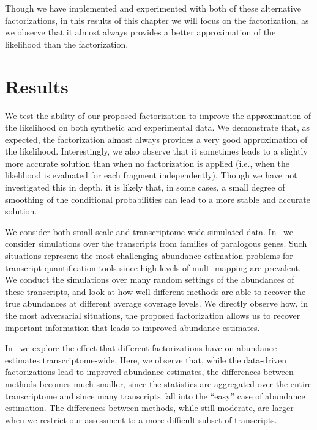 Though we have implemented and experimented with both of these alternative factorizations, 
in this results of this chapter we will focus on the \rangebased factorization, as we observe that it almost 
always provides a better approximation of the likelihood than the \rankbased factorization.

\section{Results}
\label{sec:results}

We test the ability of our proposed factorization to improve the approximation
of the \fm likelihood on both synthetic and experimental data. We demonstrate
that, as expected, the \rangebased factorization almost always provides a very
good approximation of the \fm likelihood. Interestingly, we also observe that it
sometimes leads to a slightly more accurate solution than when no factorization
is applied (i.e., when the likelihood is evaluated for each fragment
independently). Though we have not investigated this in depth, it is likely
that, in some cases, a small degree of smoothing of the conditional
probabilities can lead to a more stable and accurate solution.

We consider both small-scale and transcriptome-wide simulated data.
In~ we consider simulations over the transcripts from
families of paralogous genes. Such situations represent the most challenging
abundance estimation problems for transcript quantification tools since high
levels of multi-mapping are prevalent. We conduct the simulations over many
random settings of the abundances of these transcripts, and look at how well
different methods are able to recover the true abundances at different average
coverage levels. We directly observe how, in the most adversarial situations,
the proposed factorization allows us to recover important information that leads
to improved abundance estimates.

In~ we explore the effect that different factorizations
have on abundance estimates transcriptome-wide. Here, we observe that, while the
data-driven factorizations lead to improved abundance estimates, the differences
between methods becomes much smaller, since the statistics are aggregated over
the entire transcriptome and since many transcripts fall into the ``easy'' case
of abundance estimation. The differences between methods, while still moderate,
are larger when we restrict our assessment to a more difficult subset of transcripts.

